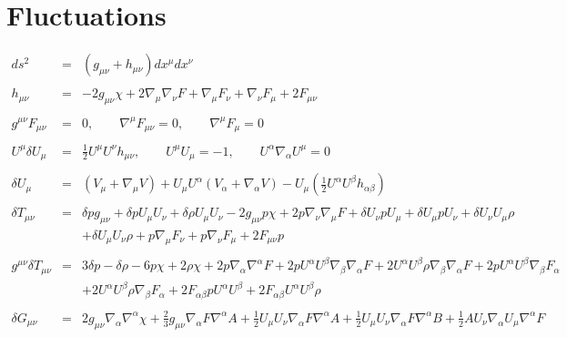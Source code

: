 \documentclass[10pt,letterpaper]{article}
\numberwithin{equation}{section}
\begin{document}
\section{Fluctuations}
\begin{eqnarray}
ds^2 &=& ( g_{\mu\nu}+ h_{\mu\nu}) dx^\mu dx^\nu
\\ \nonumber\\
h_{\mu\nu} &=& -2 g_{\mu\nu}\chi + 2\nabla_\mu \nabla_\nu F +\nabla_\mu F_\nu +\nabla_\nu F_\mu+ 2F_{\mu\nu}
\label{svt}
\\ \nonumber\\
g^{\mu\nu} F_{\mu\nu} &=&0,\qquad \nabla^\mu F_{\mu\nu} = 0,\qquad \nabla^\mu F_\mu=0 
\\ \nonumber\\
U^\mu \delta U_\mu &=& \tfrac12 U^\mu U^\nu h_{\mu\nu},\qquad U^\mu U_\mu = -1,\qquad U^\alpha\nabla_\alpha U^\mu = 0
\\ \nonumber\\
\delta U_{\mu} &=& (V_\mu + \nabla_\mu V) + U_\mu U^\alpha(V_\alpha + \nabla_\alpha V)-U_\mu\left(\tfrac12 U^\alpha U^\beta h_{\alpha\beta}\right)
\\ \nonumber\\
\delta T_{\mu\nu}&=& \delta p g_{\mu \nu } + \delta p U_{\mu } U_{\nu } + \delta \rho U_{\mu } U_{\nu } - 2 g_{\mu \nu } p \chi + 2 p \nabla_{\nu }\nabla_{\mu }F+\delta U_{\nu } p U_{\mu } + \delta U_{\mu } p U_{\nu } + \delta U_{\nu } U_{\mu } \rho \nonumber \\ 
&& + \delta U_{\mu } U_{\nu } \rho + p \nabla_{\mu }F_{\nu } + p \nabla_{\nu }F_{\mu }+2 F_{\mu \nu } p
\\  \nonumber\\ 
g^{\mu\nu}\delta T_{\mu\nu}&=& 3 \delta p -  \delta \rho - 6 p \chi + 2 \rho \chi + 2 p \nabla_{\alpha }\nabla^{\alpha }F + 2 p U^{\alpha } U^{\beta } \nabla_{\beta }\nabla_{\alpha }F + 2 U^{\alpha } U^{\beta } \rho \nabla_{\beta }\nabla_{\alpha }F+2 p U^{\alpha } U^{\beta } \nabla_{\beta }F_{\alpha } \nonumber \\ 
&& + 2 U^{\alpha } U^{\beta } \rho \nabla_{\beta }F_{\alpha }+2 F_{\alpha \beta } p U^{\alpha } U^{\beta } + 2 F_{\alpha \beta } U^{\alpha } U^{\beta } \rho 
\nonumber\\  \\ 
\delta G_{\mu\nu}&=& 2 g_{\mu \nu } \nabla_{\alpha }\nabla^{\alpha }\chi + \tfrac{2}{3} g_{\mu \nu } \nabla_{\alpha }F \nabla^{\alpha }A + \tfrac{1}{2} U_{\mu } U_{\nu } \nabla_{\alpha }F \nabla^{\alpha }A + \tfrac{1}{2} U_{\mu } U_{\nu } \nabla_{\alpha }F \nabla^{\alpha }B + \tfrac{1}{2} A U_{\nu } \nabla_{\alpha }U_{\mu } \nabla^{\alpha }F \nonumber \\ 

\end{eqnarray}
\end{document}
